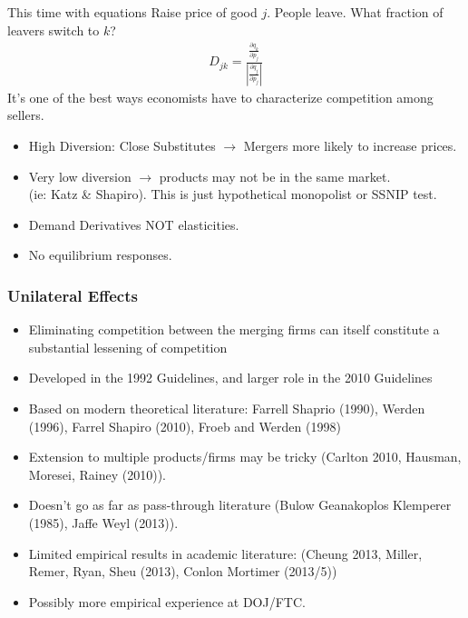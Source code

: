 \documentclass[xcolor=pdftex,dvipsnames,table,mathserif]{beamer}
\begin{document}
\begin{frame}{This time with equations}
 Raise price of good $j$. People leave. What fraction of leavers switch to $k$?
\begin{eqnarray*}
D_{jk} = \frac{\frac{\partial q_k}{\partial p_j}}{\left|\frac{\partial q_j}{\partial p_j} \right|}
\end{eqnarray*}
It's one of the best ways economists have to characterize competition among sellers.
\begin{itemize}
\item High Diversion: Close Substitutes $\rightarrow$ Mergers more likely to increase prices.
\item Very low diversion $\rightarrow$ products may not be in the same market.\\ (ie: Katz \& Shapiro). This is just hypothetical monopolist or SSNIP test.
\item Demand Derivatives NOT elasticities.
\item No equilibrium responses.
\end{itemize}
\end{frame}

\begin{frame}
\frametitle{Unilateral Effects}
\begin{itemize}
\item Eliminating competition between the merging firms can itself constitute a substantial lessening of competition
\item Developed in the 1992 Guidelines, and larger role in the 2010 Guidelines
\item Based on modern theoretical literature: Farrell Shaprio (1990), Werden (1996), Farrel Shapiro (2010), Froeb and Werden (1998)
\item Extension to multiple products/firms may be tricky (Carlton 2010, Hausman, Moresei, Rainey (2010)).
\item Doesn't go as far as pass-through literature (Bulow Geanakoplos Klemperer (1985), Jaffe Weyl (2013)). 
\item Limited empirical results in academic literature: (Cheung 2013, Miller, Remer, Ryan, Sheu (2013), Conlon Mortimer (2013/5))
\item Possibly more empirical experience at DOJ/FTC.
\end{itemize} 
\end{frame}
\end{document}
